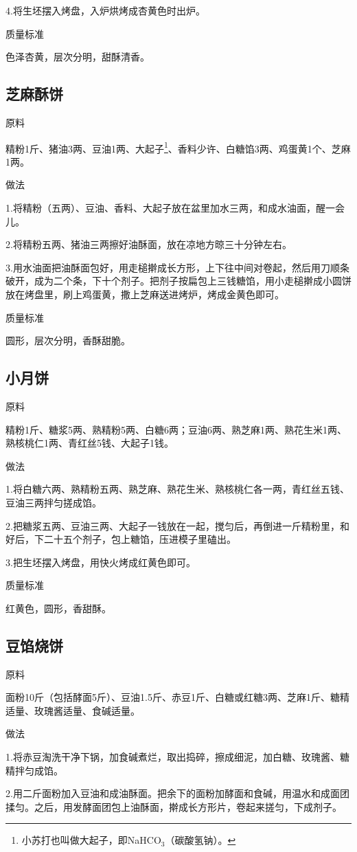 \documentclass{ctexbook}
\begin{document}
4.将生坯摆入烤盘，入炉烘烤成杏黄色时出炉。

质量标准

色泽杏黄，层次分明，甜酥清香。
\subsection{芝麻酥饼}
原料

精粉1斤、猪油3两、豆油1两、大起子\footnote{小苏打也叫做大起子，即NaHCO$_3$（碳酸氢钠）。}、香料少许、白糖馅3两、鸡蛋黄1个、芝麻1两。

做法

1.将精粉（五两）、豆油、香料、大起子放在盆里加水三两，和成水油面，醒一会儿。

2.将精粉五两、猪油三两擦好油酥面，放在凉地方晾三十分钟左右。

3.用水油面把油酥面包好，用走槌擀成长方形，上下往中间对卷起，然后用刀顺条破开，成为二个条，下十个剂子。把剂子按扁包上三钱糖馅，用小走槌擀成小圆饼放在烤盘里，刷上鸡蛋黄，撒上芝麻送进烤炉，烤成金黄色即可。

质量标准

圆形，层次分明，香酥甜脆。
\subsection{小月饼}
原料

精粉1斤、糖浆5两、熟精粉5两、白糖6两；豆油6两、熟芝麻1两、熟花生米1两、熟核桃仁1两、青红丝5钱、大起子1钱。

做法

1.将白糖六两、熟精粉五两、熟芝麻、熟花生米、熟核桃仁各一两，青红丝五钱、豆油三两拌匀搓成馅。

2.把糖浆五两、豆油三两、大起子一钱放在一起，搅匀后，再倒进一斤精粉里，和好后，下二十五个剂子，包上糖馅，压进模子里磕出。

3.把生坯摆入烤盘，用快火烤成红黄色即可。

质量标准

红黄色，圆形，香甜酥。
\subsection{豆馅烧饼}
原料

面粉10斤（包括酵面5斤）、豆油1.5斤、赤豆1斤、白糖或红糖3两、芝麻1斤、糖精适量、玫瑰酱适量、食碱适量。

做法

1.将赤豆淘洗干净下锅，加食碱煮烂，取出捣碎，擦成细泥，加白糖、玫瑰酱、糖精拌匀成馅。

2.用二斤面粉加入豆油和成油酥面。把余下的面粉加酵面和食碱，用温水和成面团揉匀。之后，用发酵面团包上油酥面，擀成长方形片，卷起来搓匀，下成剂子。
\end{document}
